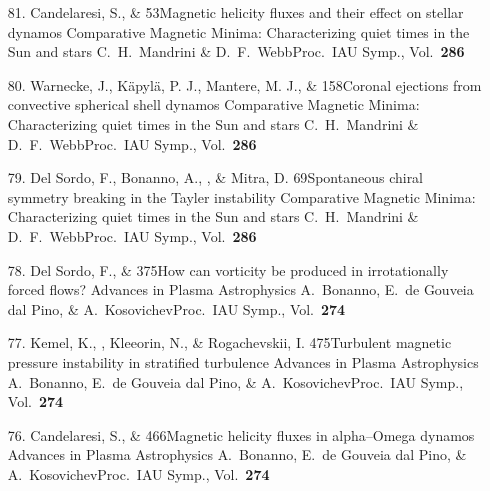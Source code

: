 \begin{itemize}
\item[81.]
Candelaresi, S., \& \Brandenburg{}
{53}{Magnetic helicity fluxes and their effect on stellar dynamos}
{Comparative Magnetic Minima: Characterizing quiet times in the Sun and stars}
{C.\ H.\ Mandrini \& D.\ F.\ Webb}{Proc.\ IAU Symp., Vol.\ {\bf 286}}

\item[80.]
Warnecke, J., K\"apyl\"a, P. J., Mantere, M. J., \& \Brandenburg{}
{158}{Coronal ejections from convective spherical shell dynamos}
{Comparative Magnetic Minima: Characterizing quiet times in the Sun and stars}
{C.\ H.\ Mandrini \& D.\ F.\ Webb}{Proc.\ IAU Symp., Vol.\ {\bf 286}}

\item[79.]
Del Sordo, F., Bonanno, A., \Brandenburg, \& Mitra, D.
{69}{Spontaneous chiral symmetry breaking in the Tayler instability}
{Comparative Magnetic Minima: Characterizing quiet times in the Sun and stars}
{C.\ H.\ Mandrini \& D.\ F.\ Webb}{Proc.\ IAU Symp., Vol.\ {\bf 286}}

\item[78.]
Del Sordo, F., \& \Brandenburg{}
{375}{How can vorticity be produced in irrotationally forced flows?}
{Advances in Plasma Astrophysics}
{A.\ Bonanno, E.\ de Gouveia dal Pino, \& A.\ Kosovichev}{Proc.\ IAU Symp., Vol.\ {\bf 274}}

\item[77.]
Kemel, K., \Brandenburg, Kleeorin, N., \& Rogachevskii, I.
{475}{Turbulent magnetic pressure instability in stratified turbulence}
{Advances in Plasma Astrophysics}
{A.\ Bonanno, E.\ de Gouveia dal Pino, \& A.\ Kosovichev}{Proc.\ IAU Symp., Vol.\ {\bf 274}}

\item[76.]
Candelaresi, S., \& \Brandenburg{}
{466}{Magnetic helicity fluxes in alpha--Omega dynamos}
{Advances in Plasma Astrophysics}
{A.\ Bonanno, E.\ de Gouveia dal Pino, \& A.\ Kosovichev}{Proc.\ IAU Symp., Vol.\ {\bf 274}}


\end{itemize}
